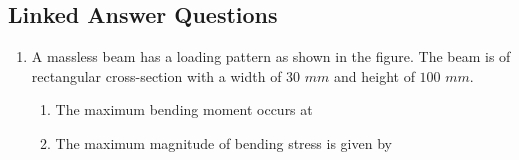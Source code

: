 \documentclass[journal,12pt,onecolumn]{IEEEtran}
\theoremstyle{remark}
\begin{document}
\subsection*{Linked Answer Questions}
\begin{enumerate}
\item A massless beam has a loading pattern as shown in the figure. The beam is of rectangular cross-section with a width of $30$ $mm$ and height of $100$ $mm$.
\\\begin{center}
   \scalebox{0.5}{}
\end{center}

\begin{enumerate}
\item The maximum bending moment occurs at

\hfill{}
\begin{enumerate}[label=(\alph*)]
\end{enumerate}

\item The maximum magnitude of bending stress  is given by

\hfill{}
\begin{enumerate}[label=(\alph*)]
\end{enumerate}
\end{enumerate}
\end{enumerate}
\end{document}
